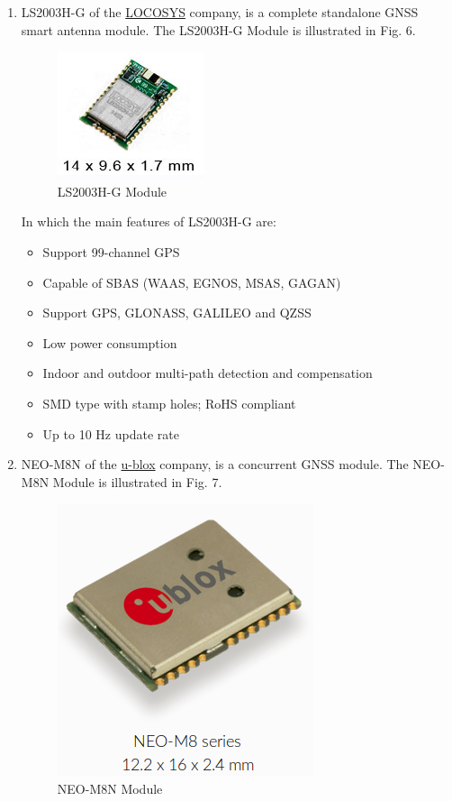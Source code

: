 \documentclass[10pt,journal,compsoc]{IEEEtran}
\begin{document}
\begin{enumerate}[\IEEEsetlabelwidth{2)}]

\item LS2003H-G of the \href{http://www.locosystech.com}{LOCOSYS} company, is a complete standalone GNSS smart antenna module. The LS2003H-G Module is illustrated in Fig. 6.

\begin{figure}[h]
  \centering
  \captionsetup{justification=centering}
  \includegraphics[scale=.45]{es5}
  \caption{LS2003H-G Module}
  \label{fig:fig6}
\end{figure}

\hfil

In which the main features of LS2003H-G are:

\begin{itemize}
  \item Support 99-channel GPS
  \item Capable of SBAS (WAAS, EGNOS, MSAS, GAGAN)
  \item Support GPS, GLONASS, GALILEO and QZSS
  \item Low power consumption
  \item Indoor and outdoor multi-path detection and compensation
  \item SMD type with stamp holes; RoHS compliant
  \item Up to 10 Hz update rate
\end{itemize}

\hfil

\item NEO-M8N of the \href{https://www.u-blox.com/en}{u-blox} company, is a concurrent GNSS module. The NEO-M8N Module is illustrated in Fig. 7.

\begin{figure}[h]
  \centering
  \captionsetup{justification=centering}
  \includegraphics[scale=.45]{es6}
  \caption{NEO-M8N Module}
  \label{fig:fig7}
\end{figure}


\end{enumerate}
\end{document}
